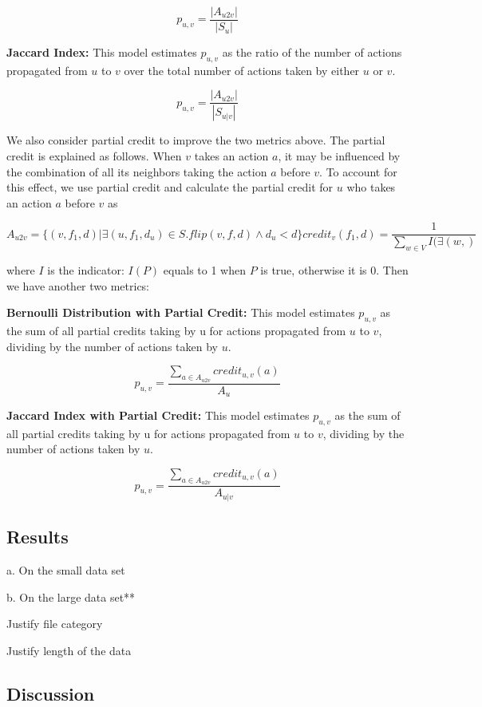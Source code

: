 \begin{equation}
p_{u,v} = \frac{|A_{u2v}|}{|S_u|}
\end{equation}

\textbf{Jaccard Index:} This model estimates $p_{u,v}$ as the ratio of the number of actions propagated from $u$ to $v$ over the total number of actions taken by either $u$ or $v$.

\begin{equation}
p_{u,v} = \frac{|A_{u2v}|}{|S_{u|v}|}
\end{equation}

We also consider partial credit to improve the two metrics above.
The partial credit is explained as follows. When $v$ takes an action $a$, it may be influenced by the combination of all its neighbors taking the action $a$ before $v$. To account for this effect, we use partial credit and calculate the partial credit for $u$ who takes an action $a$ before $v$ as

\begin{equation}
A_{u2v} = \{(v, f_1, d)| \exists (u, f_1, d_u)\in S. flip(v, f, d) \land d_u<d \}

credit_{v}(f_1, d) = \frac{1}{\sum_{w \in V}I(\exists (w, )}
\end{equation}

where $I$ is the indicator: $I(P)$ equals to 1 when $P$ is true, otherwise it is 0. Then we have another two metrics:

\textbf{Bernoulli Distribution with Partial Credit:} This model estimates $p_{u,v}$ as the sum of all partial credits taking by u for actions propagated from $u$ to $v$, dividing by the number of actions taken by $u$.

\begin{equation}
p_{u,v} = \frac{\sum_{a\in A_{u2v}}credit_{u,v}(a)}{A_{u}}
\end{equation}

\textbf{Jaccard Index with Partial Credit:} This model estimates $p_{u,v}$ as the sum of all partial credits taking by u for actions propagated from $u$ to $v$, dividing by the number of actions taken by $u$.

\begin{equation}
p_{u,v} = \frac{\sum_{a\in A_{u2v}}credit_{u,v}(a)}{A_{u|v}}
\end{equation}


\subsection{Results}

a. On the small data set

b. On the large data set**

Justify file category

Justify length of the data

\subsection{Discussion}
